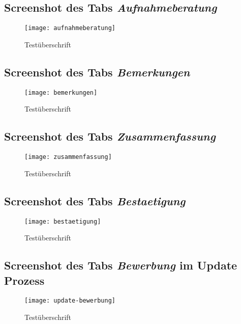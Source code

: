 \begin{landscape}
\subsection{Screenshot des Tabs \textit{Aufnahmeberatung}}
\label{section-aufnahmeberatung}
\begin{figure}[H]
    \centering
    \caption{Testüberschrift}
    \begin{adjustbox}{width=\linewidth, center}
        \texttt{[image: aufnahmeberatung]}
    \end{adjustbox}
\end{figure}

\subsection{Screenshot des Tabs \textit{Bemerkungen}}
\label{section-bemerkungen}
\begin{figure}[H]
    \centering
    \caption{Testüberschrift}
    \begin{adjustbox}{width=\linewidth, center}
        \texttt{[image: bemerkungen]}
    \end{adjustbox}
\end{figure}

\subsection{Screenshot des Tabs \textit{Zusammenfassung}}
\label{section-zusammenfassung}
\begin{figure}[H]
    \centering
    \caption{Testüberschrift}
    \begin{adjustbox}{width=\linewidth, center}
        \texttt{[image: zusammenfassung]}
    \end{adjustbox}
\end{figure}

\subsection{Screenshot des Tabs \textit{Bestaetigung}}
\label{section-bestaetigung}
\begin{figure}[H]
    \centering
    \caption{Testüberschrift}
    \begin{adjustbox}{width=\linewidth, center}
        \texttt{[image: bestaetigung]}
    \end{adjustbox}
\end{figure}

\subsection{Screenshot des Tabs \textit{Bewerbung} im Update Prozess}
\label{section-update-bewerbung}
\begin{figure}[H]
    \centering
    \caption{Testüberschrift}
    \begin{adjustbox}{width=\linewidth, center}
        \texttt{[image: update-bewerbung]}
    \end{adjustbox}
\end{figure}

\end{landscape}
